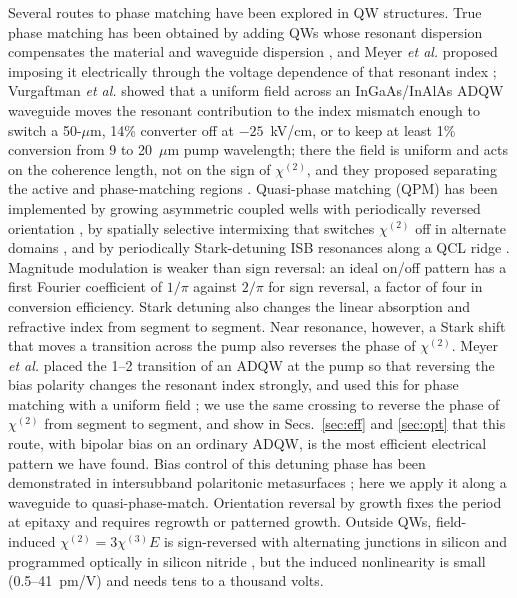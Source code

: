 \documentclass[11pt]{article}
\newcommand{\chitwo}{\chi^{(2)}}
\begin{document}
Several routes to phase matching have been explored in QW structures. True phase matching has been obtained by adding QWs whose resonant dispersion compensates the material and waveguide dispersion \cite{Vurgaftman1996,Vodopyanov1998}, and Meyer \emph{et al.} proposed imposing it electrically through the voltage dependence of that resonant index \cite{Meyer1995APL}; Vurgaftman \emph{et al.} showed that a uniform field across an InGaAs/InAlAs ADQW waveguide moves the resonant contribution to the index mismatch enough to switch a 50-$\mu$m, 14\% converter off at $-25$~kV/cm, or to keep at least 1\% conversion from 9 to 20~$\mu$m pump wavelength; there the field is uniform and acts on the coherence length, not on the sign of $\chitwo$, and they proposed separating the active and phase-matching regions \cite{Vurgaftman1996SSC,VurgaftmanNLO1996}. Quasi-phase matching (QPM) has been implemented by growing asymmetric coupled wells with periodically reversed orientation \cite{Janz1994,Fiore1997}, by spatially selective intermixing that switches $\chitwo$ off in alternate domains \cite{Bouchard2000,Zeaiter2003}, and by periodically Stark-detuning ISB resonances along a QCL ridge \cite{Belkin2006}. Magnitude modulation is weaker than sign reversal: an ideal on/off pattern has a first Fourier coefficient of $1/\pi$ against $2/\pi$ for sign reversal, a factor of four in conversion efficiency. Stark detuning also changes the linear absorption and refractive index from segment to segment. Near resonance, however, a Stark shift that moves a transition across the pump also reverses the phase of $\chitwo$. Meyer \emph{et al.} placed the 1--2 transition of an ADQW at the pump so that reversing the bias polarity changes the resonant index strongly, and used this for phase matching with a uniform field \cite{Meyer1995APL}; we use the same crossing to reverse the phase of $\chitwo$ from segment to segment, and show in Secs.~\ref{sec:eff} and \ref{sec:opt} that this route, with bipolar bias on an ordinary ADQW, is the most efficient electrical pattern we have found. Bias control of this detuning phase has been demonstrated in intersubband polaritonic metasurfaces \cite{Yu2025}; here we apply it along a waveguide to quasi-phase-match. Orientation reversal by growth fixes the period at epitaxy and requires regrowth or patterned growth. Outside QWs, field-induced $\chitwo=3\chi^{(3)}E$ is sign-reversed with alternating junctions in silicon \cite{Timurdogan2017} and programmed optically in silicon nitride \cite{Yanagimoto2026}, but the induced nonlinearity is small (0.5--41~pm/V) and needs tens to a thousand volts.
\end{document}
